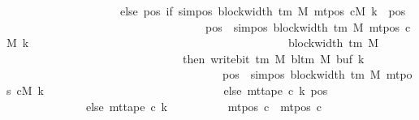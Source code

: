 \begin{isabellebody}
\ \ \ \ \ \ \ \ \ \ \ \ \ \ \ \ \ \ \ \ else\ {\isacharparenleft}{\kern0pt}{\isasymlambda}pos{\isachardot}{\kern0pt}\ if\ sim{\isacharunderscore}{\kern0pt}pos\ {\isacharparenleft}{\kern0pt}block{\isacharunderscore}{\kern0pt}width\ {\isacharparenleft}{\kern0pt}{\isasymGamma}{\isacharunderscore}{\kern0pt}tm\ M{\isacharparenright}{\kern0pt}{\isacharparenright}{\kern0pt}\ {\isacharparenleft}{\kern0pt}mt{\isacharunderscore}{\kern0pt}pos\ cM\ k{\isacharparenright}{\kern0pt}\ {\isasymle}\ pos\isanewline
\ \ \ \ \ \ \ \ \ \ \ \ \ \ \ \ \ \ \ \ \ \ \ \ \ \ \ \ \ \ \ \ \ \ {\isasymand}\ pos\ {\isacharless}{\kern0pt}\ sim{\isacharunderscore}{\kern0pt}pos\ {\isacharparenleft}{\kern0pt}block{\isacharunderscore}{\kern0pt}width\ {\isacharparenleft}{\kern0pt}{\isasymGamma}{\isacharunderscore}{\kern0pt}tm\ M{\isacharparenright}{\kern0pt}{\isacharparenright}{\kern0pt}\ {\isacharparenleft}{\kern0pt}mt{\isacharunderscore}{\kern0pt}pos\ cM\ k{\isacharparenright}{\kern0pt}\isanewline
\ \ \ \ \ \ \ \ \ \ \ \ \ \ \ \ \ \ \ \ \ \ \ \ \ \ \ \ \ \ \ \ \ \ \ \ \ \ \ \ \ \ \ \ {\isacharplus}{\kern0pt}\ block{\isacharunderscore}{\kern0pt}width\ {\isacharparenleft}{\kern0pt}{\isasymGamma}{\isacharunderscore}{\kern0pt}tm\ M{\isacharparenright}{\kern0pt}\isanewline
\ \ \ \ \ \ \ \ \ \ \ \ \ \ \ \ \ \ \ \ \ \ \ \ \ \ \ \ \ \ \ then\ write{\isacharunderscore}{\kern0pt}bit\ {\isacharparenleft}{\kern0pt}{\isasymGamma}{\isacharunderscore}{\kern0pt}tm\ M{\isacharparenright}{\kern0pt}\ {\isacharparenleft}{\kern0pt}bl{\isacharunderscore}{\kern0pt}tm\ M{\isacharparenright}{\kern0pt}\ {\isacharparenleft}{\kern0pt}buf\ k{\isacharparenright}{\kern0pt}\isanewline
\ \ \ \ \ \ \ \ \ \ \ \ \ \ \ \ \ \ \ \ \ \ \ \ \ \ \ \ \ \ \ \ \ \ \ \ \ \ {\isacharparenleft}{\kern0pt}pos\ {\isacharminus}{\kern0pt}\ sim{\isacharunderscore}{\kern0pt}pos\ {\isacharparenleft}{\kern0pt}block{\isacharunderscore}{\kern0pt}width\ {\isacharparenleft}{\kern0pt}{\isasymGamma}{\isacharunderscore}{\kern0pt}tm\ M{\isacharparenright}{\kern0pt}{\isacharparenright}{\kern0pt}\ {\isacharparenleft}{\kern0pt}mt{\isacharunderscore}{\kern0pt}pos\ cM\ k{\isacharparenright}{\kern0pt}{\isacharparenright}{\kern0pt}\isanewline
\ \ \ \ \ \ \ \ \ \ \ \ \ \ \ \ \ \ \ \ \ \ \ \ \ \ \ \ \ \ \ else\ mt{\isacharunderscore}{\kern0pt}tape\ c{}\ k\ pos{\isacharparenright}{\kern0pt}{\isacharparenright}{\kern0pt}\isanewline
\ \ \ \ \ \ \ \ \ \ \ \ \ \ else\ mt{\isacharunderscore}{\kern0pt}tape\ c{}\ k{\isacharparenright}{\kern0pt}\isanewline
\ \ \ \ \ \ \ \ \ {\isasymand}\ mt{\isacharunderscore}{\kern0pt}pos\ c\ {\isacharequal}{\kern0pt}\ mt{\isacharunderscore}{\kern0pt}pos\ c{}{\isacharparenright}{\kern0pt}{\isachardoublequoteclose}\isanewline

\end{isabellebody}
